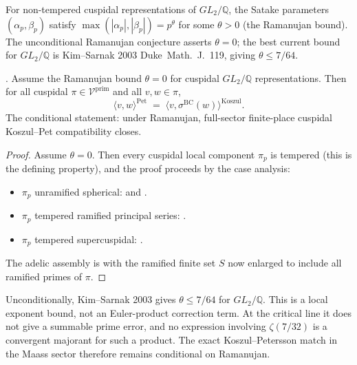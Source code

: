 For non-tempered cuspidal representations of \(GL_{2}/\mathbb{Q}\),
the Satake parameters \((\alpha_{p},\beta_{p})\) satisfy
\(\max(|\alpha_{p}|,|\beta_{p}|)=p^{\theta}\) for some \(\theta>0\)
(the Ramanujan bound). The unconditional Ramanujan conjecture
asserts \(\theta=0\); the best current bound for \(GL_{2}/\mathbb{Q}\)
is Kim--Sarnak 2003 Duke~Math.~J.~119, giving \(\theta\leq 7/64\).

\begin{proposition}
\label{v4-arith:kms-gns:prop:non-tempered-residue}
\ClaimStatusConditional. Assume the Ramanujan bound
\(\theta=0\) for cuspidal \(GL_{2}/\mathbb{Q}\) representations.
Then for all cuspidal \(\pi\in\mathcal{V}^{\mathrm{prim}}\) and all
\(v,w\in\pi\),
\begin{equation}
\langle v,w\rangle^{\mathrm{Pet}}\;=\;\langle v,\sigma^{\mathrm{BC}}(w)\rangle^{\mathrm{Koszul}}.
\end{equation}
The conditional statement: under Ramanujan, full-sector
finite-place cuspidal Koszul--Pet compatibility closes.
\end{proposition}

\begin{proof}
Assume \(\theta=0\). Then every cuspidal local component \(\pi_{p}\)
is tempered (this is the defining property), and the proof proceeds
by the case analysis:
\begin{itemize}
\item \(\pi_{p}\) unramified spherical:
 and
.
\item \(\pi_{p}\) tempered ramified principal series:
.
\item \(\pi_{p}\) tempered supercuspidal:
.
\end{itemize}
The adelic assembly is
 with the ramified finite set
\(S\) now enlarged to include all ramified primes of \(\pi\).
\end{proof}

\begin{remark}
\label{v4-arith:kms-gns:rem:partial-KS}
Unconditionally, Kim--Sarnak 2003 gives \(\theta\leq 7/64\) for
\(GL_{2}/\mathbb{Q}\). This is a local exponent bound, not an
Euler-product correction term. At the critical line it does not give a
summable prime error, and no expression involving
\(\zeta(7/32)\) is a convergent majorant for such a product. The exact
Koszul--Petersson match in the Maass sector therefore remains
conditional on Ramanujan.
\end{remark}

